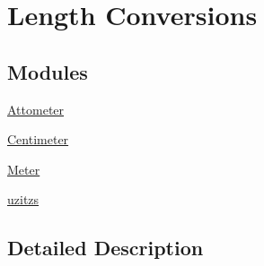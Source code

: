 \hypertarget{group___e_g_x_math-_conversions-_length_conversions}{}\section{Length Conversions}
\label{group___e_g_x_math-_conversions-_length_conversions}
\subsection*{Modules}
\begin{DoxyCompactItemize}
\item 
\mbox{\hyperlink{group___e_g_x_math-_conversions-_length_conversions-_attometer}{Attometer}}
\item 
\mbox{\hyperlink{group___e_g_x_math-_conversions-_length_conversions-_centimeter}{Centimeter}}
\item 
\mbox{\hyperlink{group___e_g_x_math-_conversions-_length_conversions-_meter}{Meter}}
\item 
\mbox{\hyperlink{group___e_g_x_math-_conversions-_length_conversions-uzitzs}{uzitzs}}
\end{DoxyCompactItemize}


\subsection{Detailed Description}
